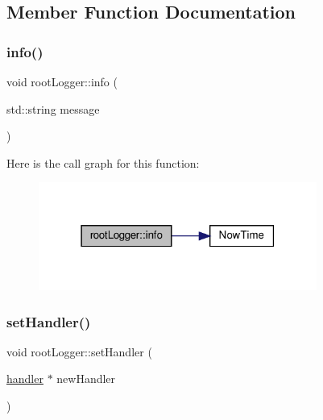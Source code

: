 \subsection{Member Function Documentation}
\mbox{\label{structroot_logger_af163fa3b8e6f1c7d4a2d1dd9fe1594ce}} 
\subsubsection{\texorpdfstring{info()}{info()}}
{\footnotesize\ttfamily void root\+Logger\+::info (\begin{DoxyParamCaption}\item[{std\+::string}]{message }\end{DoxyParamCaption})\hspace{0.3cm}{\ttfamily [static]}}

Here is the call graph for this function\+:\nopagebreak
\begin{figure}[H]
\begin{center}
\leavevmode
\includegraphics[width=259pt]{d7/d88/structroot_logger_af163fa3b8e6f1c7d4a2d1dd9fe1594ce_cgraph}
\end{center}
\end{figure}
\mbox{\label{structroot_logger_a2b12bc69ec8a404d513d7db3ea856be5}} 
\subsubsection{\texorpdfstring{set\+Handler()}{setHandler()}}
{\footnotesize\ttfamily void root\+Logger\+::set\+Handler (\begin{DoxyParamCaption}\item[{\hyperlink{classhandler}{handler} $\ast$}]{new\+Handler }\end{DoxyParamCaption})\hspace{0.3cm}{\ttfamily [static]}}



